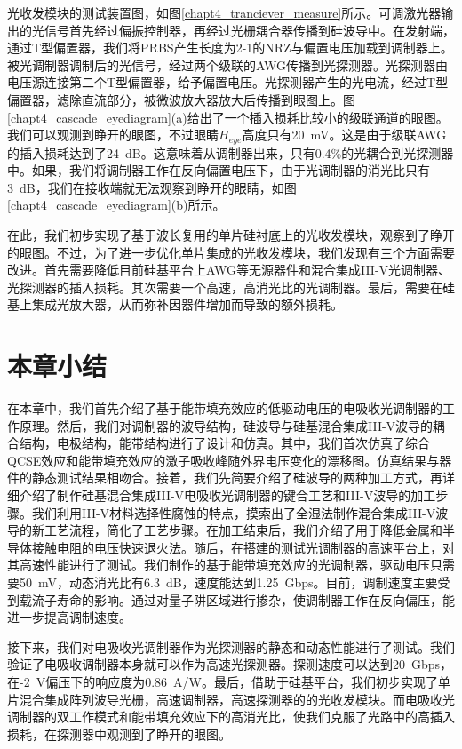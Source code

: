 光收发模块的测试装置图，如图\ref{chapt4_tranciever_measure}所示。可调激光器输出的光信号首先经过偏振控制器，再经过光栅耦合器传播到硅波导中。在发射端，通过T型偏置器，我们将PRBS产生长度为2-1的NRZ与偏置电压加载到调制器上。被光调制器调制后的光信号，经过两个级联的AWG传播到光探测器。光探测器由电压源连接第二个T型偏置器，给予偏置电压。光探测器产生的光电流，经过T型偏置器，滤除直流部分，被微波放大器放大后传播到眼图上。图\ref{chapt4_cascade_eyediagram}(a)给出了一个插入损耗比较小的级联通道的眼图。我们可以观测到睁开的眼图，不过眼睛$H_{eye}$高度只有20~mV。这是由于级联AWG的插入损耗达到了24~dB。这意味着从调制器出来，只有0.4\%的光耦合到光探测器中。如果，我们将调制器工作在反向偏置电压下，由于光调制器的消光比只有3~dB，我们在接收端就无法观察到睁开的眼睛，如图\ref{chapt4_cascade_eyediagram}(b)所示。

在此，我们初步实现了基于波长复用的单片硅衬底上的光收发模块，观察到了睁开的眼图。不过，为了进一步优化单片集成的光收发模块，我们发现有三个方面需要改进。首先需要降低目前硅基平台上AWG等无源器件和混合集成III-V光调制器、光探测器的插入损耗。其次需要一个高速，高消光比的光调制器。最后，需要在硅基上集成光放大器，从而弥补因器件增加而导致的额外损耗。

\section{本章小结}
在本章中，我们首先介绍了基于能带填充效应的低驱动电压的电吸收光调制器的工作原理。然后，我们对调制器的波导结构，硅波导与硅基混合集成III-V波导的耦合结构，电极结构，能带结构进行了设计和仿真。其中，我们首次仿真了综合QCSE效应和能带填充效应的激子吸收峰随外界电压变化的漂移图。仿真结果与器件的静态测试结果相吻合。接着，我们先简要介绍了硅波导的两种加工方式，再详细介绍了制作硅基混合集成III-V电吸收光调制器的键合工艺和III-V波导的加工步骤。我们利用III-V材料选择性腐蚀的特点，摸索出了全湿法制作混合集成III-V波导的新工艺流程，简化了工艺步骤。在加工结束后，我们介绍了用于降低金属和半导体接触电阻的电压快速退火法。随后，在搭建的测试光调制器的高速平台上，对其高速性能进行了测试。我们制作的基于能带填充效应的光调制器，驱动电压只需要50~mV，动态消光比有6.3~dB，速度能达到1.25~Gbps。目前，调制速度主要受到载流子寿命的影响。通过对量子阱区域进行掺杂，使调制器工作在反向偏压，能进一步提高调制速度。

接下来，我们对电吸收光调制器作为光探测器的静态和动态性能进行了测试。我们验证了电吸收调制器本身就可以作为高速光探测器。探测速度可以达到20~Gbps，在-2~V偏压下的响应度为0.86~A/W。最后，借助于硅基平台，我们初步实现了单片混合集成阵列波导光栅，高速调制器，高速探测器的的光收发模块。而电吸收光调制器的双工作模式和能带填充效应下的高消光比，使我们克服了光路中的高插入损耗，在探测器中观测到了睁开的眼图。
